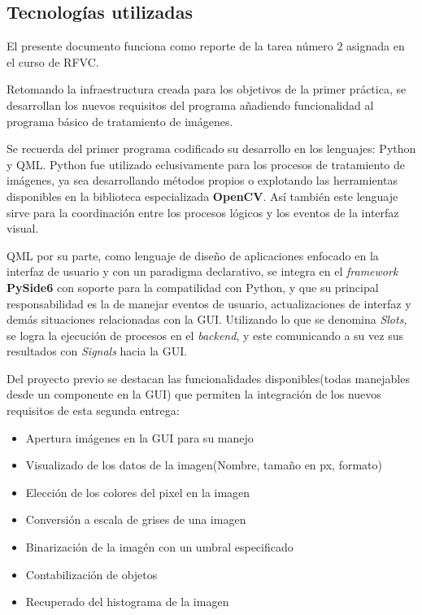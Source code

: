 \subsection*{Tecnologías utilizadas}
	\hfill\break
	\justifying
	El presente documento funciona como reporte de la tarea número 2 asignada en el curso de RFVC.
	
	\hfill\break
	\justifying
	Retomando la infraestructura creada para los objetivos de la primer práctica, se desarrollan los nuevos requisitos del programa añadiendo funcionalidad al programa básico de tratamiento de imágenes.
	
	\hfill\break
	\justifying 
	Se recuerda del primer programa codificado su desarrollo en los lenguajes: Python y QML. Python fue utilizado eclusivamente para los procesos de tratamiento de imágenes, ya sea desarrollando métodos propios o explotando las herramientas disponibles en la biblioteca especializada \textbf{OpenCV}. Así también este lenguaje sirve para la coordinación entre los procesos lógicos y los eventos de la interfaz visual.
	
	\hfill\break
	\justifying
	QML por su parte, como lenguaje de diseño de aplicaciones enfocado en la interfaz de usuario y con un paradigma declarativo, se integra en el \textit{framework} \textbf{PySide6} con soporte para la compatilidad con Python, y que su principal responsabilidad es la de manejar eventos de usuario, actualizaciones de interfaz y demás situaciones relacionadas con la GUI. Utilizando lo que se denomina \textit{Slots}, se logra la ejecución de procesos en el \textit{backend}, y este comunicando a su vez sus resultados con \textit{Signals} hacia la GUI.
	
	\hfill\break
	\justifying
	Del proyecto previo se destacan las funcionalidades disponibles(todas manejables desde un componente en la GUI) que permiten la integración de los nuevos requisitos de esta segunda entrega:
	\begin{itemize}
		\item Apertura imágenes en la GUI para su manejo
		\item Visualizado de los datos de la imagen(Nombre, tamaño en px, formato)
		\item Elección de los colores del pixel en la imagen
		\item Conversión a escala de grises de una imagen
		\item Binarización de la imagén con un umbral especificado
		\item Contabilización de objetos
		\item Recuperado del histograma de la imagen
	\end{itemize}
	
